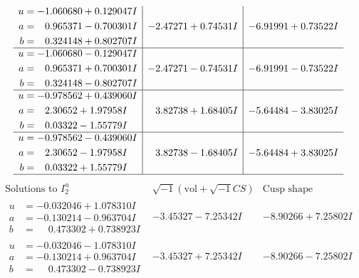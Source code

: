 \documentclass[1p]{elsarticle_modified}
\theoremstyle{definition}
\newcommand{\I}{\sqrt{-1}}
\begin{document}
$$\begin{array}{c|c|c}
\begin{aligned}
u &= -1.060680 + 0.129047 I \\
a &= \phantom{-}0.965371 - 0.700301 I \\
b &= \phantom{-}0.324148 + 0.802707 I\end{aligned}
 & -2.47271 + 0.74531 I & -6.91991 + 0.73522 I \\ \hline\begin{aligned}
u &= -1.060680 - 0.129047 I \\
a &= \phantom{-}0.965371 + 0.700301 I \\
b &= \phantom{-}0.324148 - 0.802707 I\end{aligned}
 & -2.47271 - 0.74531 I & -6.91991 - 0.73522 I \\ \hline\begin{aligned}
u &= -0.978562 + 0.439060 I \\
a &= \phantom{-}2.30652 + 1.97958 I \\
b &= \phantom{-}0.03322 - 1.55779 I\end{aligned}
 & \phantom{-}3.82738 + 1.68405 I & -5.64484 - 3.83025 I \\ \hline\begin{aligned}
u &= -0.978562 - 0.439060 I \\
a &= \phantom{-}2.30652 - 1.97958 I \\
b &= \phantom{-}0.03322 + 1.55779 I\end{aligned}
 & \phantom{-}3.82738 - 1.68405 I & -5.64484 + 3.83025 I\\
 \hline 
 \end{array}$$\newpage$$\begin{array}{c|c|c}  
\text{Solutions to }I^u_{2}& \I (\text{vol} + \sqrt{-1}CS) & \text{Cusp shape}\\
 \hline 
\begin{aligned}
u &= -0.032046 + 1.078310 I \\
a &= -0.130214 - 0.963704 I \\
b &= \phantom{-}0.473302 + 0.738923 I\end{aligned}
 & -3.45327 - 7.25342 I & -8.90266 + 7.25802 I \\ \hline\begin{aligned}
u &= -0.032046 - 1.078310 I \\
a &= -0.130214 + 0.963704 I \\
b &= \phantom{-}0.473302 - 0.738923 I\end{aligned}
 & -3.45327 + 7.25342 I & -8.90266 - 7.25802 I \\ \hline\begin{aligned}

\end{aligned}
\end{array}$$
\end{document}
